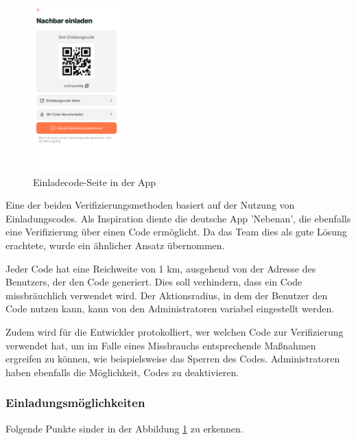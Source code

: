 \begin{figure}[H]
  \centering
  \includegraphics[width=0.3\textwidth]{pics/einladecode-page.png}
  \caption{Einladecode-Seite in der App}
  \label{fig:einladecode}
\end{figure}
Eine der beiden Verifizierungsmethoden basiert auf der Nutzung von Einladungscodes. Als Inspiration diente die deutsche App 'Nebenan', die ebenfalls eine Verifizierung über einen Code ermöglicht. Da das Team dies als gute Lösung erachtete, wurde ein ähnlicher Ansatz übernommen.

Jeder Code hat eine Reichweite von 1 km, ausgehend von der Adresse des Benutzers, der den Code generiert. Dies soll verhindern, dass ein Code missbräuchlich verwendet wird. Der Aktionsradius, in dem der Benutzer den Code nutzen kann, kann von den Administratoren variabel eingestellt werden.

Zudem wird für die Entwickler protokolliert, wer welchen
Code zur Verifizierung verwendet hat, um im Falle eines
Missbrauchs entsprechende Maßnahmen ergreifen zu können, wie
beispielsweise das Sperren des Codes. Administratoren haben
ebenfalls die Möglichkeit, Codes zu deaktivieren.
\subsubsection{Einladungsmöglichkeiten}


Folgende Punkte sinder in der Abbildung
\ref{fig:einladecode} zu erkennen.


